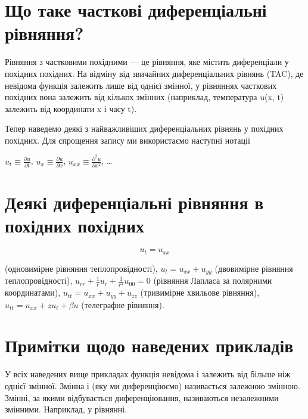 \section{Що таке часткові диференціальні рівняння?}\label{ux449ux43e-ux442ux430ux43aux435-ux447ux430ux441ux442ux43aux43eux432ux456-ux434ux438ux444ux435ux440ux435ux43dux446ux456ux430ux43bux44cux43dux456-ux440ux456ux432ux43dux44fux43dux43dux44f}

Рівняння з частковими похідними --- це рівняння, яке містить диференціали у похідних похідних. На відміну від звичайних диференціальних рівнянь (TAC), де невідома функція залежить лише від однієї змінної, у рівняннях часткових похідних вона залежить від кількох змінних (наприклад, температура u(x, t) залежить від координати x і часу t).

Тепер наведемо деякі з найважливіших диференціальних рівнянь у похідних похідних. Для спрощення запису ми використаємо наступні нотації

\(u_t \equiv \frac{\partial u}{\partial t}\), \(u_x \equiv \frac{\partial u}{\partial x}\), \(u_{xx} \equiv \frac{\partial^2 u}{\partial x^2}\), \ldots{}

\section{Деякі диференціальні рівняння в похідних похідних}\label{ux434ux435ux44fux43aux456-ux434ux438ux444ux435ux440ux435ux43dux446ux456ux430ux43bux44cux43dux456-ux440ux456ux432ux43dux44fux43dux43dux44f-ux432-ux43fux43eux445ux456ux434ux43dux438ux445-ux43fux43eux445ux456ux434ux43dux438ux445}

\[u_t = u_{xx}\]

(одновимірне рівняння теплопровідності), \(u_t = u_{xx} + u_{yy}\) (двовимірне рівняння теплопровідності), \(u_{rr} + \frac{1}{r}u_r + \frac{1}{r^2}u_{00} = 0\) (рівняння Лапласа за полярними координатами), \(u_{tt} = u_{xx} + u_{yy} + u_{zz}\) (тривимірне хвильове рівняння), \(u_{tt} = u_{xx} + zu_t + \beta u\) (телеграфне рівняння).

\section{Примітки щодо наведених прикладів}\label{ux43fux440ux438ux43cux456ux442ux43aux438-ux449ux43eux434ux43e-ux43dux430ux432ux435ux434ux435ux43dux438ux445-ux43fux440ux438ux43aux43bux430ux434ux456ux432}

У всіх наведених вище прикладах функція невідома і залежить від більше ніж однієї змінної. Змінна і (яку ми диференціюємо) називається залежною змінною. Змінні, за якими відбувається диференціювання, називаються незалежними змінними. Наприклад, у рівнянні.

